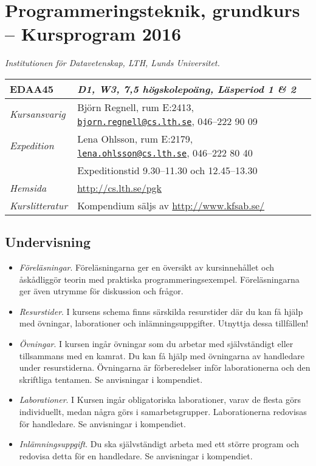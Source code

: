 \documentclass[a4paper,12pt,oneside]{memoir}
\begin{document}
\section*{Programmeringsteknik, grundkurs  -- Kursprogram 2016}
\emph{Institutionen för Datavetenskap, LTH, Lunds Universitet.}\\

\begin{longtable}[l]{ll}
\toprule
\textbf{EDAA45} & \textit {D1, W3, 7,5 högskolepoäng, Läsperiod 1 \& 2} \tabularnewline
\midrule
\endhead
\emph{Kursansvarig}   & Björn Regnell, rum E:2413,
                        \href{mailto:bjorn.regnell@cs.lth.se}
                        {\nolinkurl{bjorn.regnell@cs.lth.se}},
                        046--222 90 09\tabularnewline
\emph{Expedition}     & Lena Ohlsson, rum E:2179, 
                        \href{mailto:lena.ohlsson@cs.lth.se}
                        {\nolinkurl{lena.ohlsson@cs.lth.se}}, 
                        046--222 80 40\tabularnewline
                      & Expeditionstid 9.30--11.30 och 12.45--13.30\tabularnewline
\emph{Hemsida}        & \url{http://cs.lth.se/pgk}\tabularnewline
\emph{Kurslitteratur} & Kompendium säljs av \url{http://www.kfsab.se/}\tabularnewline

\bottomrule
\end{longtable}

\subsection{Undervisning}\label{undervisning}

\begin{itemize}
\item
  \emph{Föreläsningar}. Föreläsningarna ger en översikt av
  kursinnehållet och åskådliggör teorin med praktiska
  programmeringsexempel. Föreläsningarna ger även utrymme för diskussion
  och frågor.
\item
  \emph{Resurstider}. I kursens schema finns särskilda resurstider
  där du kan få hjälp med övningar, laborationer och
  inlämningsuppgifter. Utnyttja dessa tillfällen!
\item
  \emph{Övningar}. I kursen ingår övningar som du arbetar med
  självständigt eller tillsammans med en kamrat. 
  Du kan få hjälp med övningarna av handledare under resurstiderna. 
  Övningarna är förberedelser inför laborationerna och den skriftliga tentamen. 
  Se anvisningar i kompendiet.
\item
  \emph{Laborationer}. I Kursen ingår obligatoriska laborationer,
  varav de flesta görs individuellt, medan några görs i samarbetsgrupper.
  Laborationerna redovisas för handledare. 
  Se anvisningar i kompendiet.
\item
  \emph{Inlämningsuppgift}. Du ska självständigt arbeta med ett större
  program och redovisa detta för en handledare. Se anvisningar i
  kompendiet.
\end{itemize}
\end{document}
